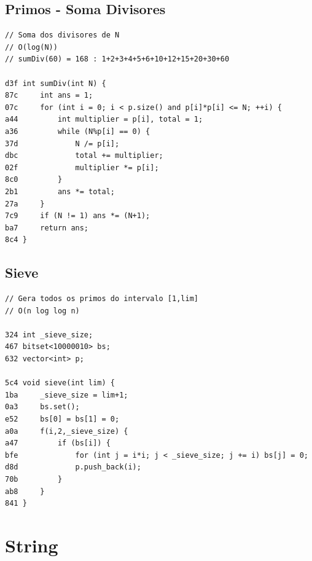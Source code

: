 \documentclass[11pt, a4paper, twoside]{article}
\begin{document}
\subsection{Primos - Soma Divisores}
\begin{lstlisting}
// Soma dos divisores de N
// O(log(N))
// sumDiv(60) = 168 : 1+2+3+4+5+6+10+12+15+20+30+60

d3f int sumDiv(int N) {
87c     int ans = 1;
07c     for (int i = 0; i < p.size() and p[i]*p[i] <= N; ++i) {
a44         int multiplier = p[i], total = 1;
a36         while (N%p[i] == 0) {
37d             N /= p[i];
dbc             total += multiplier;
02f             multiplier *= p[i];
8c0         }
2b1         ans *= total;
27a     }
7c9     if (N != 1) ans *= (N+1);
ba7     return ans;
8c4 }
\end{lstlisting}

\subsection{Sieve}
\begin{lstlisting}
// Gera todos os primos do intervalo [1,lim]
// O(n log log n)

324 int _sieve_size;
467 bitset<10000010> bs;
632 vector<int> p;

5c4 void sieve(int lim) {
1ba     _sieve_size = lim+1;
0a3     bs.set();
e52     bs[0] = bs[1] = 0;
a0a     f(i,2,_sieve_size) { 
a47         if (bs[i]) {
bfe             for (int j = i*i; j < _sieve_size; j += i) bs[j] = 0;
d8d             p.push_back(i);
70b         }
ab8     }
841 }
\end{lstlisting}



%
%

\section{String}
\end{document}
